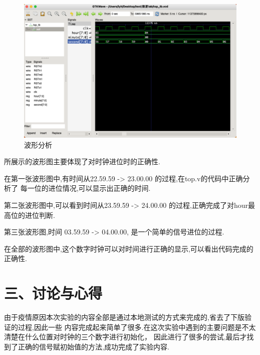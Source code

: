 \documentclass{article}
\begin{document}
        \begin{figure}[H]
            \centering
            \includegraphics[width=1\textwidth]{6.png}
            \caption{\label{Lab12}波形分析}
            \end{figure}

所展示的波形图主要体现了对时钟进位时的正确性.

在第一张波形图中,有时间从22.59.59 -> 23.00.00 的过程,在top.v的代码中正确分析了
每一位的进位情况,可以显示出正确的时间.

第二张波形图中,可以看到时间从23.59.59 -> 24.00.00 的过程,正确完成了对hour最高位的进位判断.

第三张波形图,时间 03.59.59 -> 04.00.00, 是一个简单的信号进位的过程.

在全部的波形图中,这个数字时钟可以对时间进行正确的显示,可以看出代码完成的正确性.
            




\section*{三、讨论与心得}
由于疫情原因本次实验的内容全部是通过本地测试的方式来完成的,省去了下版验证的过程,因此一些
内容完成起来简单了很多.在这次实验中遇到的主要问题是不太清楚在什么位置对时钟的三个数字进行初始化，
因此进行了很多的尝试,最后才找到了正确的信号赋初始值的方法,成功完成了实验内容.
\end{document}

